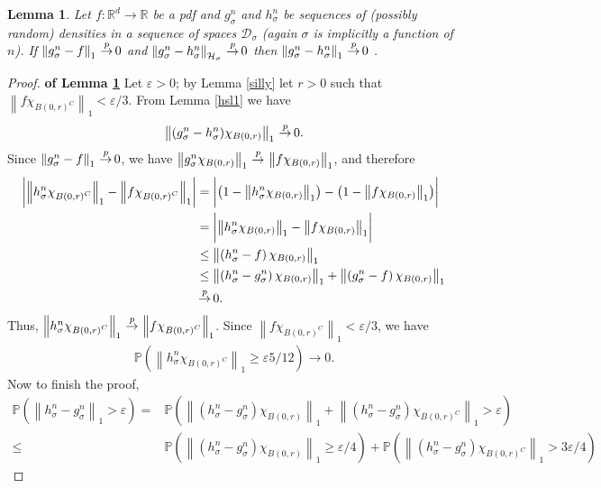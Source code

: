 \documentclass{article} %
\def\hsig{{\mathcal{H}_\sigma}}
\def\dsig{{\mathcal{D}_\sigma}}
\def\cip{\,{\buildrel p \over \rightarrow}\,}
\def\rn{\mathbb{R}}
\def\l{\left}
\def\r{\right}
\newtheorem{lem}{Lemma}
\theoremstyle{definition}
\begin{document}
\begin{lem}\label{lem:htol1cvg}
	Let $f:\rn^d \to \rn$ be a pdf and $g_\sigma^n$ and $h_\sigma^n$ be sequences of (possibly random) densities in a sequence of spaces $\dsig$ (again $\sigma$ is implicitly a function of $n$). If $\l\|g_\sigma^n-f\r\|_1 \cip 0$ and $\l\|g_\sigma^n-h_\sigma^n\r\|_\hsig \cip 0$ then $\l\|g_\sigma^n-h_\sigma^n\r\|_1 \cip 0$ .
\end{lem}
\begin{proof}{\bf of Lemma \ref{lem:htol1cvg}}
	Let $\varepsilon>0$; by Lemma \ref{silly} let $r>0$ such that $\l\| f\chi_{B(0,r)^C}\r\|_1 < \varepsilon/3$. From Lemma \ref{hsl1} we have
	\begin{eqnarray*}
		\l\|(g_\sigma^n- h_\sigma^n)\chi_{B(0,r)} \r\|_1 \cip 0.
	\end{eqnarray*}
	Since $\l\|g_\sigma^n -f \r\|_1 \cip 0$, we have $\l\|g_\sigma^n\chi_{B(0,r)}\r\|_1 \cip \l\|f\chi_{B(0,r)}\r\|_1$, and therefore
	\begin{eqnarray*}
		\biggl| \l\|h_\sigma^n \chi_{B\l(0,r\r)^C}\r\|_1 - \l\|f\chi_{B\l(0,r\r)^C} \r\|_1 \biggr|
		&=\biggl|\l(1-\l\|h_\sigma^n\chi_{B(0,r)}\r\|_1\r) -\l( 1-\l\|f\chi_{B(0,r)}\r\|_1\r)\biggr|\\
		&=\biggl|\l\|h_\sigma^n\chi_{B\l(0,r\r)}\r\|_1 - \l\|f\chi_{B\l(0,r\r)}\r\|_1\biggr|\\
		&\le \l\|\l(h_\sigma^n -f \r) \chi_{B\l(0,r\r)}\r\|_1\\
		&\le \l\|\l(h_\sigma^n-g_\sigma^n\r)\chi_{B\l(0,r\r)}\r\|_1+\l\|\l(g_\sigma^n-f\r)\chi_{B\l(0,r\r)}\r\|_1\\
		&\cip 0.
	\end{eqnarray*}
	Thus, $\l\|h_\sigma^n\chi_{B\l(0,r\r)^C}\r\|_1 \cip \l\|f\chi_{B\l(0,r\r)^C}\r\|_1$.
	Since $\l\|f\chi_{B(0,r)^C}\r\|_1 <\varepsilon/3$, we have
	\begin{eqnarray}
		\mathbb{P}\l( \l\|h_\sigma^n \chi_{B(0,r)^C}\r\|_1 \ge \varepsilon5/12 \r)\to 0\label{compbnd}.
	\end{eqnarray}
	Now to finish the proof,
	\begin{eqnarray*}
		\mathbb{P}\l(\l\| h_\sigma^n - g_\sigma^n \r\|_1> \varepsilon\r)
		=& \mathbb{P}\l(   \l\|(h_\sigma^n- g_\sigma^n)\chi_{B(0,r)} \r\|_1+ \l\|\l(h_\sigma^n- g_\sigma^n\r)\chi_{B(0,r)^C} \r\|_1   > \varepsilon\r)\\
		\le& \mathbb{P}\l(   \l\|\l(h_\sigma^n- g_\sigma^n\r)\chi_{B(0,r)} \r\|_1 \ge\varepsilon/4\r) + \mathbb{P}\l(   \l\|\l(h_\sigma^n- g_\sigma^n\r)\chi_{B(0,r)^C} \r\|_1   > 3\varepsilon/4\r)

\end{eqnarray*}
\end{proof}
\end{document}
